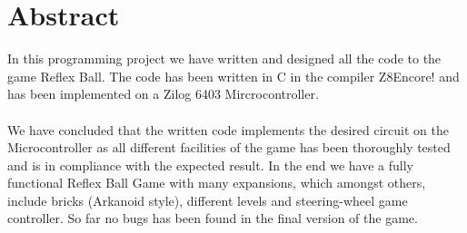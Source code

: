 \chapter{Abstract}

In this programming project we have written and designed all the code to the game Reflex Ball. The code has been written in C in the compiler Z8Encore! and has been implemented on a Zilog 6403 Mircrocontroller. \\ \\
We have concluded that the written code implements the desired circuit on the Microcontroller as all different facilities of the game has been thoroughly tested and is in compliance with the expected result. In the end we have a fully functional Reflex Ball Game with many expansions, which amongst others, include bricks (Arkanoid style), different levels and steering-wheel game controller. So far no bugs has been found in the final version of the game.